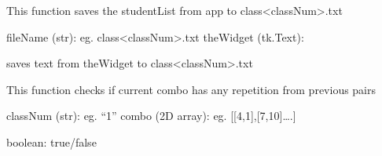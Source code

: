 \documentclass[letterpaper,10pt,english]{sphinxmanual}
\begin{document}

\begin{fulllineitems}
\label{\detokenize{GUI:GUI.saveStudentList}}
\pysigstartsignatures
{}
\pysigstopsignatures
\sphinxAtStartPar
This function saves the studentList from app to class\textless{}classNum\textgreater{}.txt
\begin{description}
\sphinxAtStartPar
fileName (str): eg. class\textless{}classNum\textgreater{}.txt
theWidget (tk.Text):

\sphinxAtStartPar
saves text from theWidget to class\textless{}classNum\textgreater{}.txt

\end{description}

\end{fulllineitems}


\sphinxstepscope
{}\label{\detokenize{pairing:module-pairing}}

\begin{fulllineitems}
\label{\detokenize{pairing:pairing.checkValid}}
\pysigstartsignatures
{}
\pysigstopsignatures
\sphinxAtStartPar
This function checks if current combo has any repetition from previous pairs
\begin{description}
\sphinxAtStartPar
classNum (str): eg. “1”
combo (2D array): eg. {[}{[}4,1{]},{[}7,10{]}….{]}

\sphinxAtStartPar
boolean: true/false

\end{description}

\end{fulllineitems}

\end{document}
